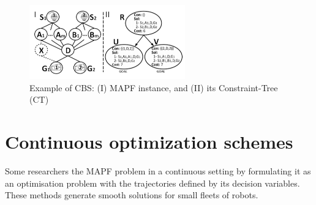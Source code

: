 \begin{figure}
\centering
\includegraphics[width=0.6\textwidth]{./images/CBS}
\caption{Example of CBS: (I) MAPF instance, and (II) its Constraint-Tree (CT)}
\label{fig:cbs}
\end{figure}

\section{Continuous optimization schemes}
Some researchers the MAPF problem in a continuous setting by formulating it as an optimisation problem with the trajectories defined by its decision variables. These methods generate smooth solutions for small fleets of robots. 

